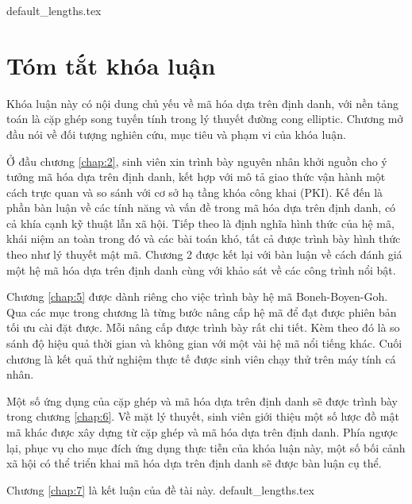 \documentclass[class=report, crop=false]{standalone}
\begin{document}
	{default_lengths.tex}
	\chapter*{Tóm tắt khóa luận}
	Khóa luận này có nội dung chủ yếu về mã hóa dựa trên định danh, với nền tảng toán là cặp ghép song tuyến tính trong lý thuyết đường cong elliptic. Chương mở đầu nói về đối tượng nghiên cứu, mục tiêu và phạm vi của khóa luận.

	Ở đầu chương \ref{chap:2}, sinh viên xin trình bày nguyên nhân khởi nguồn cho ý tưởng mã hóa dựa trên định danh, kết hợp với mô tả giao thức vận hành một cách trực quan và so sánh với cơ sở hạ tầng khóa công khai (PKI). Kế đến là phần bàn luận về các tính năng và vấn đề trong mã hóa dựa trên định danh, có cả khía cạnh kỹ thuật lẫn xã hội. Tiếp theo là định nghĩa hình thức của hệ mã, khái niệm an toàn trong đó và các bài toán khó, tất cả được trình bày hình thức theo như lý thuyết mật mã. Chương 2 được kết lại với bàn luận về cách đánh giá một hệ mã hóa dựa trên định danh cùng với khảo sát về các công trình nổi bật.

	Chương \ref{chap:5} được dành riêng cho việc trình bày hệ mã Boneh-Boyen-Goh. Qua các mục trong chương là từng bước nâng cấp hệ mã để đạt được phiên bản tối ưu cài đặt được. Mỗi nâng cấp được trình bày rất chi tiết. Kèm theo đó là so sánh độ hiệu quả thời gian và không gian với một vài hệ mã nổi tiếng khác. Cuối chương là kết quả thử nghiệm thực tế được sinh viên chạy thử trên máy tính cá nhân.

	Một số ứng dụng của cặp ghép và mã hóa dựa trên định danh sẽ được trình bày trong chương \ref{chap:6}. Về mặt lý thuyết, sinh viên giới thiệu một số lược đồ mật mã khác được xây dựng từ cặp ghép và mã hóa dựa trên định danh. Phía ngược lại, phục vụ cho mục đích ứng dụng thực tiễn của khóa luận này, một số bối cảnh xã hội có thể triển khai mã hóa dựa trên định danh sẽ được bàn luận cụ thể.

	Chương \ref{chap:7} là kết luận của đề tài này.
	\newpage
	{default_lengths.tex}
\end{document}
